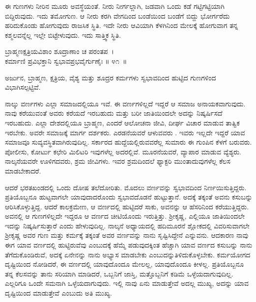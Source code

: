 ಈ ಗುಣಗಳು ನೀರಿನ ಮೂರು ಅವಸ್ಥೆಯಂತೆ. ನೀರು ನೀರ್ಗಲ್ಲಾಗಿ, ಜಡವಾಗಿ ಒಂದು ಕಡೆ ಗಟ್ಟಿಗಟ್ಟಿಯಾಗಿ ಬಿದ್ದಿರುವುದು. ಇದು ತಮೋಗುಣ. ಆ ನೀರು ಕರಗಿ ವೇಗದಿಂದ ಬಂಡೆಯಿಂದ ಬಂಡೆಗೆ ಬಿದ್ದು ಭೋರ್ಗರೆದು ಹರಿದುಕೊಂಡು ಹೋಗುವುದು ರಾಜಸಿಕ ಸ್ಥಿತಿ. ಇದೇ ನೀರು ಆವಿಯಾಗಿ ಕೆಳಗಿನಿಂದ ಮೇಲಕ್ಕೆ ಹೋಗುವಾಗ ತನ್ನ ಕಶ್ಮಲವನ್ನೆಲ್ಲ ಇಲ್ಲೇ ಬಿಟ್ಟೇಳುವುದು. ಇದು ಸಾತ್ತ್ವಿಕ ಸ್ಥಿತಿ.

\begin{shloka}
ಬ್ರಾಹ್ಮಣಕ್ಷತ್ರಿಯವಿಶಾಂ ಶೂದ್ರಾಣಾಂ ಚ ಪರಂತಪ~।\\ಕರ್ಮಾಣಿ ಪ್ರವಿಭಕ್ತಾನಿ ಸ್ವಭಾವಪ್ರಭವೈರ್ಗುಣೈಃ \hfill॥ ೪೧~॥
\end{shloka}

\begin{artha}
ಅರ್ಜುನ, ಬ್ರಾಹ್ಮಣ, ಕ್ಷತ್ರಿಯ, ವೈಶ್ಯ ಮತ್ತು ಶೂದ್ರರ ಕರ್ಮಗಳು ಸ್ವಭಾವದಿಂದ ಹುಟ್ಟಿದ ಗುಣಗಳಿಂದ ವಿಭಾಗಿಸಲ್ಪಟ್ಟಿವೆ.
\end{artha}

ನಾಲ್ಕು ವರ್ಣಗಳು ಎಲ್ಲಾ ಸಮಾಜದಲ್ಲಿಯೂ ಇವೆ. ಈ ವರ್ಣಗಳಿಲ್ಲದೆ ಇದ್ದರೆ ಆ ಸಮಾಜ ಅನಾಯಕವಾಗುವುದು. ನಾವು ಕರೆಯುವಂತೆ ಅವರು ಕರೆಯದೆ ಇರಬಹುದು ಮತ್ತು ಬರೀ ಜಾತಿಯಿಂದಲೇ ಅದನ್ನು ನಿಷ್ಕರ್ಷಿಸದೆ ಇರಬಹುದು. ಎಲ್ಲಾ ದೇಶದಲ್ಲಿಯೂ ಬ್ರಾಹ್ಮಣ, ಎಂದರೆ ಆಲೋಚನಾ ಜೀವಿ, ದೀರ್ಘ ವಿಚಾರ ಮಾಡುವ ತಾತ್ವಿಕ ಇರಬೇಕು. ಅವರೇ ಸಮಾಜಕ್ಕೆ ಮಾರ್ಗ ದರ್ಶಕರು. ಎರಡನೆಯವರೆ ಆಳುವವರು . ಇವರು ಇಲ್ಲದೇ ಇದ್ದರೆ ಯಾವ ಸಮಾಜವೂ ಸುವ್ಯವಸ್ಥಿತವಾಗಿರುವುದಿಲ್ಲ. ಸರ್ಕಾರದ ಹುದ್ದೆಯಲ್ಲಿರುವವರೆಲ್ಲ ಸುಮಾರು ಈ ಗುಂಪಿನ ಕೆಳಗೆ ಬರುವರು. ಪೋಲೀಸು, ಕೋರ್ಟು ಕಛೇರಿ ಮಿಲಿಟರಿ ಇವುಗಳೆಲ್ಲ ಅದರಲ್ಲಿವೆ. ಮೂರನೆಯವರೆ, ವ್ಯಾಪಾರ ಮಾಡುವ ವ್ಯೆಶ್ಯರು. ನಾಲ್ಕನೆಯವರೇ ಊಳಿಗದವರು, ಶ್ರಮ ಜೀವಿಗಳು. ಇವರ ಶ್ರಮದಿಂದಲೆ ಫ್ಯಾಕ್ಟರಿ ಮುಂತಾದುವುಗಳೆಲ್ಲ ಕೆಲಸ ಮಾಡಬೇಕಾದರೆ.

ಆದರೆ ಭರತಖಂಡದಲ್ಲಿ ಒಂದು ದೋಷ ತಲೆದೋರಿತು. ಮೊದಲು ವರ್ಣವನ್ನು ಸ್ವಭಾವದಿಂದ ನಿರ್ಣಯಿಸುತ್ತಿದ್ದರು. ಪ್ರತಿಯೊಬ್ಬನೂ ಹುಟ್ಟವಾಗಲೇ ಯಾವುದಾದರೊಂದು ಸ್ವಭಾವ\-ದೊಡನೆ ಹುಟ್ಟುತ್ತಾನೆ. ಅದಕ್ಕೆ ತಕ್ಕಂತೆ ಅವನು ಕಸುಬನ್ನು ಆರಿಸಿಕೊಳ್ಳುತ್ತಿದ್ದ. ಆದರೆ ಕಾಲಕ್ರಮೇಣ, ಆ ವರ್ಣದಲ್ಲಿ ಹುಟ್ಟಿದರೆ ಸಾಕು, ಅವನನ್ನು ಆ ಹೆಸರಿನಿಂದ ಕರೆಯುತ್ತಿದ್ದರು. ಅವನಲ್ಲಿ ಆ ಗುಣಗಳಿಲ್ಲದೇ ಇದ್ದರೂ ಆ ವರ್ಣದ ಚೀಟಿಯೊಂದು ಇರುತ್ತಿತ್ತು. ಶ‍್ರೀಕೃಷ್ಣ, ಎಲ್ಲಿಯೂ ಜಾತಿಯಿಂದಲೇ ಇದನ್ನು ನಿಷ್ಕರ್ಷಿಸುತ್ತಾರೆ ಎಂದು ಹೇಳುವುದಿಲ್ಲ. ನಾಲ್ಕನೆ ಅಧ್ಯಾಯದಲ್ಲಿ ಹದಿಮೂರನೆ ಶ್ಲೋಕದಲ್ಲಿ ವಿವರಿಸುವಾಗಲೇ ಶ‍್ರೀಕೃಷ್ಣ ಅವರ ಗುಣ ಮತ್ತು ಕರ್ಮಕ್ಕೆ ತಕ್ಕಂತೆ ಅವರ ವರ್ಣವನ್ನು ನಾನು ಸೃಷ್ಟಿಸಿದ್ದೇನೆ ಎನ್ನುವನು. ಆದಕಾರಣ ನಾವು ಈಗ ಯಾವ ವರ್ಣದಲ್ಲಿ ಹುಟ್ಟಿರುವೆವು ಎಂಬುದಕ್ಕೆ ಹೆಮ್ಮೆ ಪಡುವುದಕ್ಕಿಂತ ಹೆಚ್ಚಾಗಿ ಯಾವ ವರ್ಣದ ಕಸುಬನ್ನು ನಾನು ತೆಗೆದುಕೊಂಡಿರುವೆ, ಅದಕ್ಕೆ ಏನೇನನ್ನು ನಾನು ಅಭ್ಯಾಸ ಮಾಡಬೇಕು ಎಂಬುದನ್ನು\break ತಿಳಿದುಕೊಳ್ಳಬೇಕು. ಕರ್ಮಯೋಗದ ದೃಷ್ಟಿಯಿಂದ ನೋಡಿದರೆ, ಈ ವರ್ಣದಲ್ಲಿ ಯಾವು\-ದೊಂದೂ ಮೇಲಲ್ಲ, ಯಾವುದೊಂದೂ ಕೀಳಲ್ಲ. ಪ್ರತಿಯೊಬ್ಬನೂ ತನ್ನ ಕೆಲಸವನ್ನು ತಾನು ಸರಿಯಾಗಿ ಮಾಡಿದರೆ, ಒಬ್ಬನಿಗೆ ಜಾಸ್ತಿ, ಮತ್ತೊಬ್ಬನಿಗೆ ಕಡಿಮೆ ಒಳ್ಳೆಯದಾಗುವುದಿಲ್ಲ. ಎಲ್ಲರಿಗೂ ಒಂದೇ ಸಮನಾಗಿ ಒಳ್ಳೆಯದಾಗುವುದು. ಇಲ್ಲಿ ನಾವು ಏನು ಮಾಡುತ್ತೇವೆ ಅದಲ್ಲ ಮುಖ್ಯ, ಅದನ್ನು ಯಾವ ದೃಷ್ಟಿಯಿಂದ ಮಾಡುತ್ತೇವೆ ಎಂಬುದು ಅತಿ ಮುಖ್ಯ.

